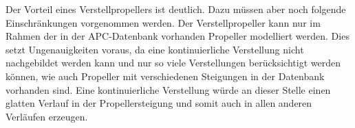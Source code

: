 Der Vorteil eines Verstellpropellers ist deutlich. Dazu müssen aber noch folgende Einschränkungen vorgenommen werden. Der Verstellpropeller kann nur im Rahmen der in der APC-Datenbank \cite{apc} vorhanden Propeller modelliert werden. Dies setzt Ungenauigkeiten voraus, da eine kontinuierliche Verstellung nicht nachgebildet werden kann und nur so viele Verstellungen berücksichtigt werden können, wie auch Propeller mit verschiedenen Steigungen in der Datenbank vorhanden sind. Eine kontinuierliche Verstellung würde an dieser Stelle einen glatten Verlauf in der Propellersteigung und somit auch in allen anderen Verläufen erzeugen. \\
